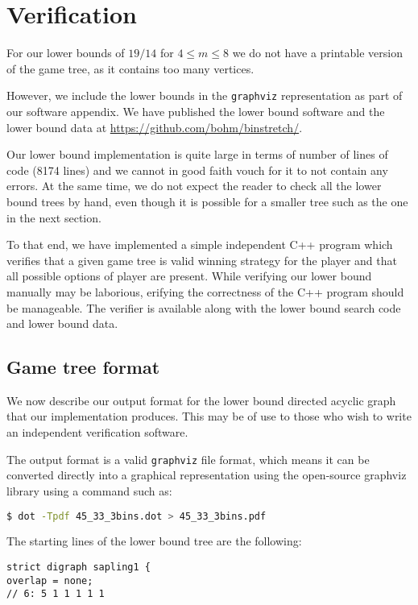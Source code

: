 \newpage
\section{Verification}\label{sec:4:verification}

For our lower bounds of $19/14$ for $4 \le m \le 8$ we do not have a
printable version of the game tree, as it contains too many vertices.

However, we include the lower bounds in the \texttt{graphviz}
representation as part of our software appendix. We have published the
lower bound software and the lower bound data at
\url{https://github.com/bohm/binstretch/}.

Our lower bound implementation is quite large in terms of number of
lines of code (8174 lines) and we cannot in good faith vouch for it to
not contain any errors. At the same time, we do not expect the reader
to check all the lower bound trees by hand, even though it is possible
for a smaller tree such as the one in the next section.

To that end, we have implemented a simple independent C++ program
which verifies that a given game tree is valid winning strategy for
the player \adversary and that all possible options of player \algo
are present. While verifying our lower bound manually may be
laborious, erifying the correctness of the C++ program should be
manageable. The verifier is available along with the lower bound
search code and lower bound data.


\subsection{Game tree format}\label{sec:4:outputformat}

We now describe our output format for the lower bound directed acyclic
graph that our implementation produces. This may be of use to those
who wish to write an independent verification software.

The output format is a valid \texttt{graphviz} file format, which
means it can be converted directly into a graphical representation
using the open-source graphviz library using a command such as:
\begin{lstlisting}[language=bash,numbers=none]
$ dot -Tpdf 45_33_3bins.dot > 45_33_3bins.pdf
\end{lstlisting}
The starting lines of the lower bound tree are the following:

\begin{lstlisting}
strict digraph sapling1 {
overlap = none;
// 6: 5 1 1 1 1 1
\end{lstlisting}

